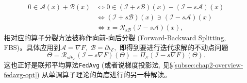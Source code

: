 \begin{align*}
0 \in \mathcal{A}(x) + \mathcal{B}(x) & \Longleftrightarrow 0 \in (\mathcal{I} + s\mathcal{B})(x) - (\mathcal{I} - s\mathcal{A})(x) \\
& \Longleftrightarrow (\mathcal{I} + s\mathcal{B})(x) \ni (\mathcal{I} - s\mathcal{A})(x) \\
& \Longleftrightarrow x = \mathcal{R}_{s\mathcal{B}}(\mathcal{I} - s\mathcal{A})(x),
\end{align*}
相对应的算子分裂方法被称作向前-向后分裂 (Forward-Backward Splitting, FBS)。具体应用到$\mathcal{A} = \nabla F,$ $\mathcal{B} = \partial \iota_{\mathcal{E}},$ 即得到要进行迭代求解的不动点问题
\begin{equation*}
\Theta = \mathcal{R}_{s\partial\iota_{\mathcal{E}}}(\mathcal{I} - s\nabla F)(\Theta) = \Pi_{\mathcal{E}}(\mathcal{I} - s\nabla F)(\Theta).
\end{equation*}
这也正好是联邦平均算法\texttt{FedAvg} (或者说梯度投影法, 见\S\ref{subsec:chap2-overview-fedavg-opt}) 从单调算子理论的角度进行的另一种解读。



